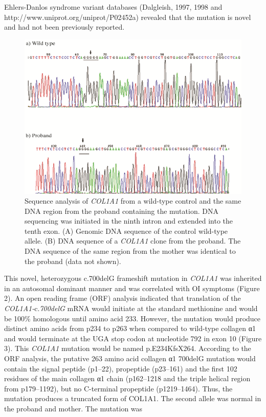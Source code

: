Ehlers-Danlos syndrome variant databases (Dalgleish, 1997, 1998 and http://www.uniprot.org/uniprot/P02452a) revealed that the mutation is novel and had not been previously reported. \begin{figure}[!h] \centering \includegraphics[width=\textwidth]{1415-4757-gmb-38-1-1-gf02.png} \caption{Sequence analysis of \textit{COL1A1} from a wild-type control and the same DNA region from the proband containing the mutation. DNA sequencing was initiated in the ninth intron and extended into the tenth exon. (A) Genomic DNA sequence of the control wild-type allele. (B) DNA sequence of a \textit{COL1A1} clone from the proband. The DNA sequence of the same region from the mother was identical to the proband (data not shown).} \label{Figure 2} \end{figure} \par This novel, heterozygous c.700delG frameshift mutation in \textit{COL1A1} was inherited in an autosomal dominant manner and was correlated with OI symptoms (Figure 2). An open reading frame (ORF) analysis indicated that translation of the \textit{COL1A1-}c.\textit{700delG} mRNA would initiate at the standard methionine and would be 100\% homologous until amino acid 233. However, the mutation would produce distinct amino acids from p234 to p263 when compared to wild-type collagen α1 and would terminate at the UGA stop codon at nucleotide 792 in exon 10 (Figure 3). This \textit{COL1A1} mutation would be named p.E234KfsX264. According to the ORF analysis, the putative 263 amino acid collagen α1 700delG mutation would contain the signal peptide (p1–22), propeptide (p23–161) and the first 102 residues of the main collagen α1 chain (p162–1218 and the triple helical region from p179–1192), but no C-terminal propeptide (p1219–1464). Thus, the mutation produces a truncated form of COL1A1. The second allele was normal in the proband and mother. The mutation was 